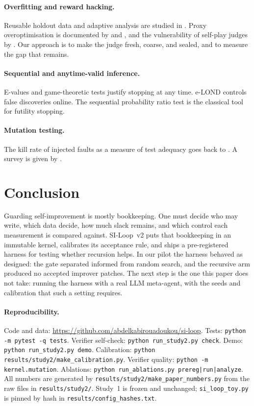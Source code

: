 \documentclass[11pt]{article}
\newcommand{\repo}{\url{https://github.com/abdelkabirouadoukou/si-loop}}
\begin{document}
\paragraph{Overfitting and reward hacking.} Reusable holdout data and adaptive analysis are studied in \citet{dwork2015holdout}. Proxy overoptimisation is documented by \citet{gao2023scaling} and \citet{coste2024ensembles}, and the vulnerability of self-play judges by \citet{zhou2026convincing}.
Our approach is to make the judge fresh, coarse, and sealed, and to measure the gap that remains.

\paragraph{Sequential and anytime-valid inference.} E-values and game-theoretic tests \citep{ramdas2023gtsavi} justify stopping at any time. e-LOND \citep{xu2024elond} controls false discoveries online. The sequential probability ratio test \citep{wald1945sprt} is the classical tool for futility stopping.

\paragraph{Mutation testing.} The kill rate of injected faults as a measure of test adequacy goes back to \citet{demillo1978mutation}. A survey is given by \citet{jia2011mutation}.

\section{Conclusion}
\label{sec:concl}

Guarding self-improvement is mostly bookkeeping. One must decide who may write, which data decide, how much slack remains, and which control each measurement is compared against.
SI-Loop~v2 puts that bookkeeping in an immutable kernel, calibrates its acceptance rule, and ships a pre-registered harness for testing whether recursion helps.
In our pilot the harness behaved as designed: the gate separated informed from random search, and the recursive arm produced no accepted improver patches.
The next step is the one this paper does not take: running the harness with a real LLM meta-agent, with the seeds and calibration that such a setting requires.

\paragraph{Reproducibility.} Code and data: \repo. Tests: \texttt{python -m pytest -q tests}. Verifier self-check: \texttt{python run\_study2.py check}. Demo: \texttt{python run\_study2.py demo}. Calibration: \texttt{python results/study2/make\_calibration.py}.
Verifier quality: \texttt{python -m kernel.mutation}. Ablations: \texttt{python run\_ablations.py prereg|run|analyze}. All numbers are generated by \texttt{results/study2/make\_paper\_numbers.py} from the raw files in \texttt{results/study2/}.
Study~1 is frozen and unchanged; \texttt{si\_loop\_toy.py} is pinned by hash in \texttt{results/config\_hashes.txt}.
\end{document}
